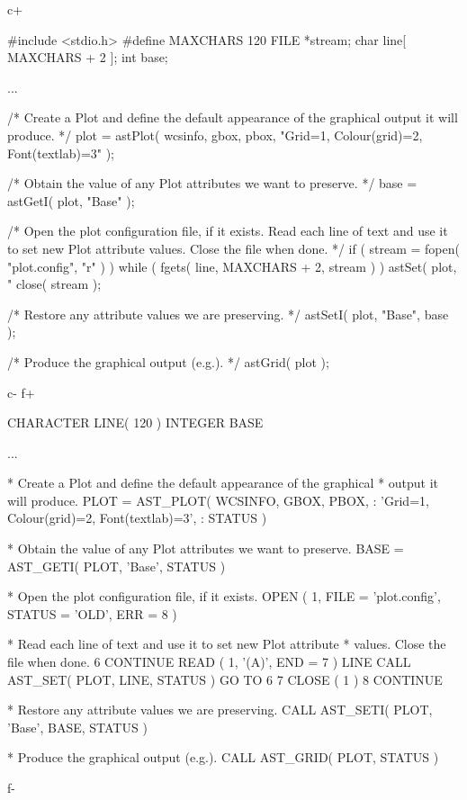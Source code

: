 \documentclass[twoside,11pt]{starlink}
\begin{document}
c+
\small
\begin{terminalv}
#include <stdio.h>
#define MAXCHARS 120
FILE *stream;
char line[ MAXCHARS + 2 ];
int base;

...

/* Create a Plot and define the default appearance of the graphical
   output it will produce. */
plot = astPlot( wcsinfo, gbox, pbox,
                "Grid=1, Colour(grid)=2, Font(textlab)=3" );

/* Obtain the value of any Plot attributes we want to preserve. */
base = astGetI( plot, "Base" );

/* Open the plot configuration file, if it exists. Read each line of
   text and use it to set new Plot attribute values. Close the file
   when done. */
if ( stream = fopen( "plot.config", "r" ) ) {
   while ( fgets( line, MAXCHARS + 2, stream ) ) astSet( plot, "%
   close( stream );
}

/* Restore any attribute values we are preserving. */
astSetI( plot, "Base", base );

/* Produce the graphical output (e.g.). */
astGrid( plot );
\end{terminalv}
\normalsize
c-
f+
\small
\begin{terminalv}
      CHARACTER LINE( 120 )
      INTEGER BASE

      ...

*  Create a Plot and define the default appearance of the graphical
*  output it will produce.
      PLOT = AST_PLOT( WCSINFO, GBOX, PBOX,
     :                 'Grid=1, Colour(grid)=2, Font(textlab)=3',
     :                 STATUS )

*  Obtain the value of any Plot attributes we want to preserve.
      BASE = AST_GETI( PLOT, 'Base', STATUS )

*  Open the plot configuration file, if it exists.
      OPEN ( 1, FILE = 'plot.config', STATUS = 'OLD', ERR = 8 )

*  Read each line of text and use it to set new Plot attribute
*  values. Close the file when done.
 6    CONTINUE
         READ ( 1, '(A)', END = 7 ) LINE
         CALL AST_SET( PLOT, LINE, STATUS )
      GO TO 6
 7    CLOSE ( 1 )
 8    CONTINUE

*  Restore any attribute values we are preserving.
      CALL AST_SETI( PLOT, 'Base', BASE, STATUS )

*  Produce the graphical output (e.g.).
      CALL AST_GRID( PLOT, STATUS )
\end{terminalv}
\normalsize
f-
\end{document}

